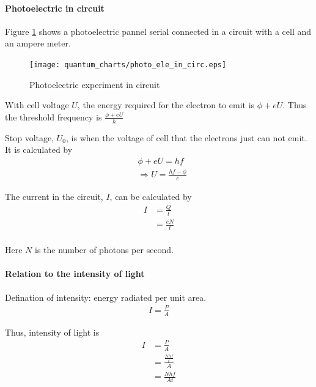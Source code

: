         \paragraph{Photoelectric in circuit}
            Figure \ref{ph_ele_in_circ} shows a photoelectric pannel serial connected in a circuit with a cell and an ampere meter. 

            \begin{figure}[H]
                \begin{center}
                    \texttt{[image: quantum\_charts/photo\_ele\_in\_circ.eps]}
                \end{center}
                \caption{Photoelectric experiment in circuit}
                \label{ph_ele_in_circ}
            \end{figure}

            With cell voltage $U$, the energy required for the electron to emit is $\phi + eU$. Thus the threshold frequency is $\frac{\phi + eU}{h}$

            Stop voltage, $U_0$, is when the voltage of cell that the electrons just can not emit. It is calculated by
            \begin{align}
                &\phi + eU = hf \\
                &\Rightarrow U = \frac{hf - \phi}{e}
            \end{align}

            The current in the circuit, $I$, can be calculated by
            \begin{align}
                I &= \frac{Q}{t} \\
                    &= \frac{eN}{t} \\
            \end{align}

            Here $N$ is the number of photons per second.
        
        \paragraph{Relation to the intensity of light}
            Defination of intensity: energy radiated per unit area.
            \begin{align}
                I = \frac{P}{A}
            \end{align}

            Thus, intensity of light is
            \begin{align}
                I &= \frac{P}{A} \\
                    &= \frac{\frac{N h f}{t}}{A} \\
                    &= \frac{N h f}{A t}
            \end{align}

